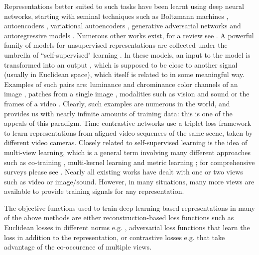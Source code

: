 \documentclass[10pt,twocolumn,letterpaper]{article}
\newcommand{\citep}[1]{\cite{#1}}
\begin{document}
Representations better suited to such tasks have been learnt using deep neural networks, starting with seminal techniques such as Boltzmann machines \citep{smolensky1986information,salakhutdinov2009deep}, autoencoders \citep{hinton2006reducing}, variational autoencoders \citep{kingma2013auto}, generative adversarial networks \citep{goodfellow2014generative} and autoregressive models \citep{oord2016pixel}. Numerous other works exist, for a review see \citep{bengio2013representation}. A powerful family of models for unsupervised representations are collected under the umbrella of ``self-supervised" learning \citep{sa2004sensory,isola2015learning,zhang2017split,zhang2016colorful,wang2015unsupervised,pathak2016context,zhang2019aet}. In these models, an input  to the model is transformed into an output , which is supposed to be close to another signal  (usually in Euclidean space), which itself is related to  in some meaningful way. Examples of such  pairs are: luminance and chrominance color channels of an image \citep{zhang2017split}, patches from a single image \citep{oord2018representation}, modalities such as vision and sound \citep{owens2016visually} or the frames of a video \citep{wang2015unsupervised}. Clearly, such examples are numerous in the world, and provides us with nearly infinite amounts of training data: this is one of the appeals of this paradigm. Time contrastive networks \citep{sermanet2017time} use a triplet loss framework to learn representations from aligned video sequences of the same scene, taken by different video cameras. Closely related to self-supervised learning is the idea of multi-view learning, which is a general term involving many different approaches such as co-training \citep{blum1998combining}, multi-kernel learning \citep{cortes2009learning} and metric learning \citep{bellet2012similarity,zhuang2019local}; for comprehensive surveys please see \citep{xu2013survey,li2018survey}. Nearly all existing works have dealt with one or two views such as video or image/sound. However, in many situations, many more views are available to provide training signals for any representation. 

The objective functions used to train deep learning based representations in many of the above methods are either reconstruction-based loss functions such as Euclidean losses in different norms e.g. \citep{isola2017image}, adversarial loss functions \citep{goodfellow2014generative} that learn the loss in addition to the representation, or contrastive losses e.g. \citep{hadsell2006dimensionality,ye2019unsupervised,sohn2016improved,gutmann2010noise,hjelm2018learning,oord2018representation,arora2019theoretical,henaff2019data,ji2019invariant} that take advantage of the co-occurence of multiple views. 
\end{document}
